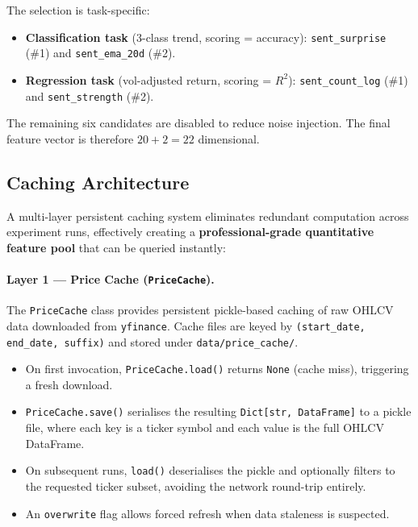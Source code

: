 \noindent
The selection is task-specific:

\begin{itemize}
  \item \textbf{Classification task} (3-class trend, scoring = accuracy):
        \texttt{sent\_surprise} (\#1) and \texttt{sent\_ema\_20d} (\#2).
  \item \textbf{Regression task} (vol-adjusted return, scoring = $R^2$):
        \texttt{sent\_count\_log} (\#1) and \texttt{sent\_strength} (\#2).
\end{itemize}

The remaining six candidates are disabled to reduce noise injection.  The final
feature vector is therefore $20 + 2 = 22$ dimensional.

\subsection{Caching Architecture}
\label{sec:caching}

A multi-layer persistent caching system eliminates redundant computation across
experiment runs, effectively creating a \textbf{professional-grade quantitative
feature pool} that can be queried instantly:

\paragraph{Layer 1 --- Price Cache (\texttt{PriceCache}).}
The \texttt{PriceCache} class provides persistent pickle-based caching of raw
OHLCV data downloaded from \texttt{yfinance}.  Cache files are keyed by
\texttt{(start\_date, end\_date, suffix)} and stored under
\texttt{data/price\_cache/}.

\begin{itemize}
  \item On first invocation, \texttt{PriceCache.load()} returns \texttt{None}
        (cache miss), triggering a fresh download.
  \item \texttt{PriceCache.save()} serialises the resulting
        \texttt{Dict[str, DataFrame]} to a pickle file, where each key is a
        ticker symbol and each value is the full OHLCV DataFrame.
  \item On subsequent runs, \texttt{load()} deserialises the pickle and
        optionally filters to the requested ticker subset, avoiding the network
        round-trip entirely.
  \item An \texttt{overwrite} flag allows forced refresh when data staleness is
        suspected.
\end{itemize}

